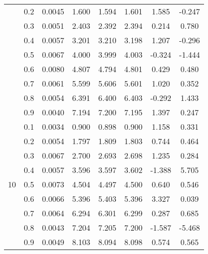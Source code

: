 \documentclass[11pt,a4paper]{report}
\begin{document}
\begin{longtable}{ | c | c || c | c | c | c | c | c | }
 & 0.2 & 0.0045 & 1.600 & 1.594 & 1.601 & 1.585 & -0.247 \\
 & 0.3 & 0.0051 & 2.403 & 2.392 & 2.394 & 0.214 & 0.780 \\
 & 0.4 & 0.0057 & 3.201 & 3.210 & 3.198 & 1.207 & -0.296 \\
 & 0.5 & 0.0067 & 4.000 & 3.999 & 4.003 & -0.324 & -1.444 \\
 & 0.6 & 0.0080 & 4.807 & 4.794 & 4.801 & 0.429 & 0.480 \\
 & 0.7 & 0.0061 & 5.599 & 5.606 & 5.601 & 1.020 & 0.352 \\
 & 0.8 & 0.0054 & 6.391 & 6.400 & 6.403 & -0.292 & 1.433 \\
 & 0.9 & 0.0040 & 7.194 & 7.200 & 7.195 & 1.397 & 0.247 \\
 \hline
\multirow{9}{*}{10} & 0.1 & 0.0034 & 0.900 & 0.898 & 0.900 & 1.158 & 0.331 \\
 & 0.2 & 0.0054 & 1.797 & 1.809 & 1.803 & 0.744 & 0.464 \\
 & 0.3 & 0.0067 & 2.700 & 2.693 & 2.698 & 1.235 & 0.284 \\
 & 0.4 & 0.0057 & 3.596 & 3.597 & 3.602 & -1.388 & 5.705 \\
 & 0.5 & 0.0073 & 4.504 & 4.497 & 4.500 & 0.640 & 0.546 \\
 & 0.6 & 0.0066 & 5.396 & 5.403 & 5.396 & 3.327 & 0.039 \\
 & 0.7 & 0.0064 & 6.294 & 6.301 & 6.299 & 0.287 & 0.685 \\
 & 0.8 & 0.0043 & 7.204 & 7.205 & 7.200 & -1.587 & -5.468 \\
 & 0.9 & 0.0049 & 8.103 & 8.094 & 8.098 & 0.574 & 0.565 \\
 \hline
\hline
\end{longtable}
\end{document}

